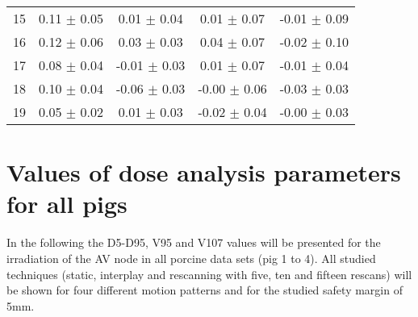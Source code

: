 \begin{table}[H]
\begin{tabular}{|c|c|c|c|c|}
15&0.11 $\pm$ 0.05 &0.01 $\pm$ 0.04 &0.01 $\pm$ 0.07 &-0.01 $\pm$ 0.09 \\ 
16&0.12 $\pm$ 0.06 &0.03 $\pm$ 0.03 &0.04 $\pm$ 0.07 &-0.02 $\pm$ 0.10 \\
17&0.08 $\pm$ 0.04 &-0.01 $\pm$ 0.03 &0.01 $\pm$ 0.07 &-0.01 $\pm$ 0.04 \\
18&0.10 $\pm$ 0.04 &-0.06 $\pm$ 0.03 &-0.00 $\pm$ 0.06 &-0.03 $\pm$ 0.03 \\
19&0.05 $\pm$ 0.02 &0.01 $\pm$ 0.03 &-0.02 $\pm$ 0.04 &-0.00 $\pm$ 0.03 \\
    \hline\hline
  \end{tabular}
  \label{tab:motion:native:AV:Pig3}
\end{table}
 

\newpage
 
\section*{Values of dose analysis parameters for all pigs}
\label{app:pigs:mmt}

 In the following the D5-D95, V95 and V107 values will be presented for the irradiation of the AV node in all porcine data sets (pig 1 to 4). 
 All studied techniques (static, interplay and rescanning with five, ten and fifteen rescans) will be shown for 
 four different motion patterns and for the studied safety margin of 5mm. 
 

